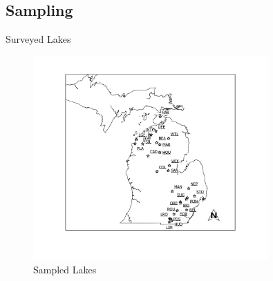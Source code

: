 \subsection{Sampling}
\begin{frame}{Surveyed Lakes}

\begin{figure}
	\centering
	\includegraphics[width=0.8\textwidth,height=\textheight]{../figures/Overview.png}
	\caption{Sampled Lakes}
\end{figure}

\end{frame}

